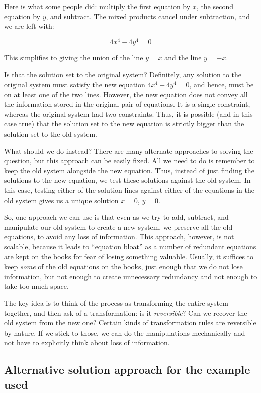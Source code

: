 \documentclass[10pt]{amsart}
\begin{document}
Here is what some people did: multiply the first equation by $x$, the
second equation by $y$, and subtract. The mixed products cancel under
subtraction, and we are left with:

$$4x^4 - 4y^4 = 0$$

This simplifies to giving the union of the line $y = x$ and the line $y = -x$.

Is that the solution set to the original system? Definitely, any
solution to the original system must satisfy the new equation $4x^4 -
4y^4 = 0$, and hence, must be on at least one of the two
lines. However, the new equation does not convey all the information
stored in the original pair of equations. It is a single constraint,
whereas the original system had two constraints. Thus, it is possible
(and in this case true) that the solution set to the new equation is
strictly bigger than the solution set to the old system.

What should we do instead? There are many alternate approaches to
solving the question, but this approach can be easily fixed. All we
need to do is remember to keep the old system alongside the new
equation. Thus, instead of just finding the solutions to the new
equation, we test these solutions against the old system. In this
case, testing either of the solution lines against either of the
equations in the old system gives us a unique solution $x = 0$, $y =
0$.


So, one approach we can use is that even as we try to add, subtract,
and manipulate our old system to create a new system, we preserve all
the old equations, to avoid any loss of information. This approach,
however, is not scalable, because it leads to ``equation bloat'' as a
number of redundant equations are kept on the books for fear of losing
something valuable. Usually, it suffices to keep {\em some} of the old
equations on the books, just enough that we do not lose information,
but not enough to create unnecessary redundancy and not enough to take
too much space.

The key idea is to think of the process as transforming the entire
system together, and then ask of a transformation: is it {\em
  reversible}? Can we recover the old system from the new one? Certain
kinds of transformation rules are reversible by nature. If we stick to
those, we can do the manipulations mechanically and not have to
explicitly think about loss of information.

\subsection*{Alternative solution approach for the example used}
\end{document}
